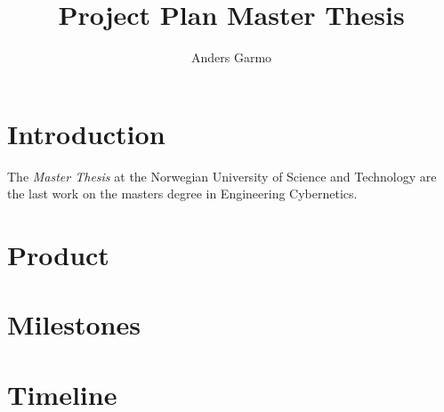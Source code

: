 \documentclass[a4paper, 10pt]{article}
\title{Project Plan Master Thesis}
\author{Anders Garmo}
\begin{document}
\maketitle


\section{Introduction}
The \emph{Master Thesis} at the Norwegian University of Science and Technology are the
last work on the masters degree in Engineering Cybernetics. 


\section{Product}


\section{Milestones}



\section{Timeline}
\end{document}
